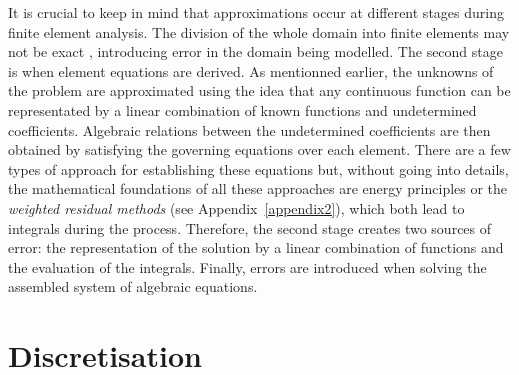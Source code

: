 It is crucial to keep in mind that approximations occur at different stages during finite element analysis. The division of the whole domain into finite elements may not be exact , introducing error in the domain being modelled. The second stage is when element equations are derived. As mentionned earlier, the unknowns of the problem are approximated using the idea that any continuous function can be representated by a linear combination of known functions and undetermined coefficients. Algebraic relations between the undetermined coefficients are then obtained by satisfying the governing equations over each element. There are a few types of approach for establishing these equations but, without going into details, the mathematical foundations of all these approaches are energy principles or the \emph{weighted residual methods} (see Appendix~\ref{appendix2}), which both lead to integrals during the process. Therefore, the second stage creates two sources of error: the representation of the solution by a linear combination of functions and the evaluation of the integrals. Finally, errors are introduced when solving the assembled system of algebraic equations. 


\section{Discretisation}

